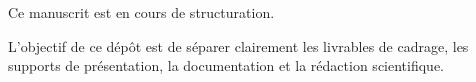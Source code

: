 Ce manuscrit est en cours de structuration.

L'objectif de ce dépôt est de séparer clairement les livrables de cadrage,
les supports de présentation, la documentation et la rédaction scientifique.